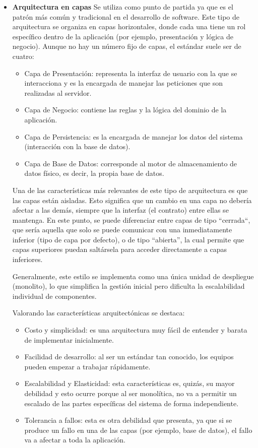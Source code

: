 \begin{itemize}
    \item \textbf{Arquitectura en capas}
    \newline
    Se utiliza como punto de partida ya que es el patrón más común y tradicional en el desarrollo de software. Este
    tipo de arquitectura se organiza en capas horizontales, donde cada una tiene un rol específico dentro de la 
    aplicación (por ejemplo, presentación y lógica de negocio). Aunque no hay un número fijo de capas, el estándar
    suele ser de cuatro:

    \begin{itemize}
        \item Capa de Presentación: representa la interfaz de usuario con la que se interacciona y es la encargada de
        manejar las peticiones que son realizadas al servidor.
        \item Capa de Negocio: contiene las reglas y la lógica del dominio de la aplicación.
        \item Capa de Persistencia: es la encargada de manejar los datos del sistema (interacción con la base de datos).
        \item Capa de Base de Datos: corresponde al motor de almacenamiento de datos físico, es decir, la propia base de datos.
    \end{itemize}

    Una de las características más relevantes de este tipo de arquitectura es que las capas están aisladas. Esto 
    significa que un cambio en una capa no debería afectar a las demás, siempre que la interfaz (el contrato) entre 
    ellas se mantenga. En este punto, se puede diferenciar entre capas de tipo ``cerrada``, que sería aquella que solo
    se puede comunicar con una inmediatamente inferior (tipo de capa por defecto), o de tipo ``abierta'', la cual permite
    que capas superiores puedan saltársela para acceder directamente a capas inferiores.

    Generalmente, este estilo se implementa como una única unidad de despliegue (monolito), lo que simplifica la gestión 
    inicial pero dificulta la escalabilidad individual de componentes.

    Valorando las características arquitectónicas se destaca:

    \begin{itemize}
        \item Costo y simplicidad: es una arquitectura muy fácil de entender y barata de implementar inicialmente.
        \item Facilidad de desarrollo: al ser un estándar tan conocido, los equipos pueden empezar a trabajar rápidamente.
        \item Escalabilidad y Elasticidad: esta características es, quizás, su mayor debilidad y esto ocurre porque al ser
        monolítica, no va a permitir un escalado de las partes específicas del sistema de forma independiente.
        \item Tolerancia a fallos: esta es otra debilidad que presenta, ya que si se produce un fallo en una de las capas
        (por ejemplo, base de datos), el fallo va a afectar a toda la aplicación.
    \end{itemize}


\end{itemize}
